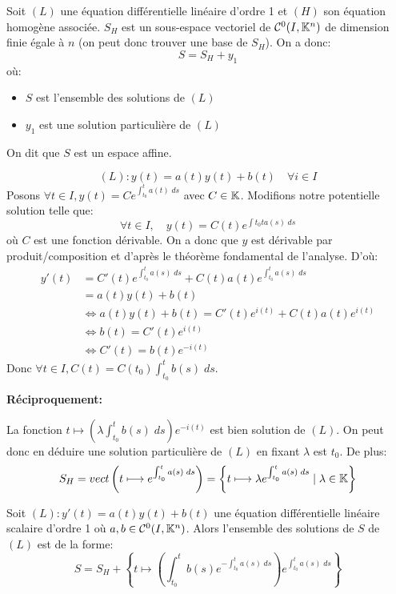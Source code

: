 \begin{theorem}[Structure]
	Soit $(L)$ une équation différentielle linéaire d'ordre 1 et $(H)$ 
	son équation homogène associée. 
	$S_H$ est un sous-espace vectoriel de $ \mathcal{C}^0(I, \mathbb{K}^n)$ de dimension finie 
	égale à $n$ (on peut donc trouver une base de $S_H$). On a donc: 
		\[ \boxed{ S = S_H + y_1 } \]
	où: 
	\begin{itemize} 
		\item $S$ est l'ensemble des solutions de $(L)$
		\item $y_1$ est une solution particulière de $(L)$
	\end{itemize}
	On dit que $S$ est un espace affine. 
\end{theorem}

\begin{remark}
		\[ (L) : y(t) = a(t) y(t) + b(t) \quad \forall i \in I \] 
	Posons $ \forall t \in I, y(t) = C e^{\int_{t_0}^{t} a(t) \; ds}$ avec $C \in \mathbb{K}$. 
	Modifions notre potentielle solution telle que: 
		\[ \forall t \in I, \quad y(t) = C(t) e^{\int{t_0}{t} a(s) \; ds} \]
	où $C$ est une fonction dérivable. On a donc que $y$ est dérivable par produit/composition
	et d'après le théorème fondamental de l'analyse. D'où: 
		\begin{align*}
			y'(t) &= C'(t) e^{\int_{t_0}^{t} a(s) \; ds} + C(t) a(t) e^{\int_{t_0}^{t} a(s) \; ds} \\
				  &= a(t)y(t) + b(t) \\
				  & \iff a(t) y(t) + b(t) = C'(t) e^{i(t)} + C(t) a(t) e^{i(t)} \\ 
				  & \iff b(t) = C'(t) e^{i(t)} \\ 
				  & \iff C'(t) = b(t) e^{-i(t)} 
		\end{align*}
	Donc $ \forall t \in I, C(t) = C(t_0) \int_{t_0}^{t} b(s) \; ds $. 
	
	\textbf{Réciproquement:}

	La fonction $ t \longmapsto \left( \lambda \int_{t_0}^{t} b(s) \; ds \right) e^{-i(t)} $ 
	est bien solution de $(L)$. On peut donc en déduire une solution particulière de $(L)$
	en fixant $\lambda$ est $t_0$. De plus: 
		\[ S_H = vect \left( t \longmapsto e^{ \int_{t_0}^{t} a(s) \; ds } \right) 
		= \left\{ t \longmapsto \lambda e^{ \int_{t_0}^{t} a(s) \; ds} \; | \; \lambda \in \mathbb{K}  \right\} \] 
\end{remark}

\begin{theorem}
	Soit $(L) : y'(t) = a(t)y(t) + b(t) $ une équation différentielle linéaire scalaire  d'ordre 1 où 
	$a,b \in \mathcal{C}^0(I, \mathbb{K}^n)$. Alors l'ensemble des solutions de $S$ de $(L)$ est de la forme: 
		\[ S = S_H + \left\{ t \longmapsto \left( \int_{t_0}^{t} b(s) e^{- \int_{t_0}^{t} a(s) \; ds} \right) e^{\int_{t_0}^{t} a(s) \; ds} \right\} \] 
\end{theorem}

